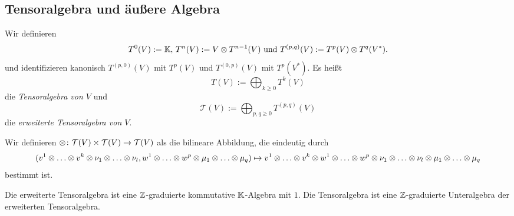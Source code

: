 \subsection{Tensoralgebra und äußere Algebra}
\label{sec:tauv}

\begin{definition}
  Wir definieren
  \begin{equation*}
    T^0(V) := \mathbb{K},\, T^n(V) := V\otimes T^{n-1}(V)\text{ und }
    T^{(p,q)}(V) := T^p(V) \otimes T^q(V^*).
  \end{equation*}
  und identifizieren kanonisch $T^{(p,0)}(V)$ mit $T^p(V)$ und
  $T^{(0,p)}(V)$ mit $T^p(V^*)$.
  Es heißt
  \begin{equation*}
    T(V) := \bigoplus_{k\geq 0} T^k(V)
  \end{equation*}
  die \emph{Tensoralgebra von $V$} und
  \begin{equation*}
    \mathcal{T}(V) := \bigoplus_{p,q \geq 0} T^{(p,q)}(V)
  \end{equation*}
  die \emph{erweiterte Tensoralgebra von $V$}.

  Wir definieren $\otimes\colon \mathcal{T}(V)\times \mathcal{T}(V)
  \to \mathcal{T}(V)$ als die bilineare Abbildung, die eindeutig durch
  \begin{equation*}
    (v^1\tensordots v^k\tensor \nu_1\tensordots \nu_l,
    w^1\tensordots w^p\tensor \mu_1\tensordots \mu_q) \mapsto
    v^1\tensordots v^k\tensor w^1\tensordots w^p \tensor
    \nu_1\tensordots \nu_l \tensor \mu_1 \tensordots \mu_q
  \end{equation*}
  bestimmt ist.
\end{definition}

\begin{proposition}
  Die erweiterte Tensoralgebra ist eine $\mathbb{Z}$-graduierte kommutative $\mathbb{K}$-Algebra
  mit $1$. Die Tensoralgebra ist eine $\mathbb{Z}$-graduierte Unteralgebra der
  erweiterten Tensoralgebra.
\end{proposition}

